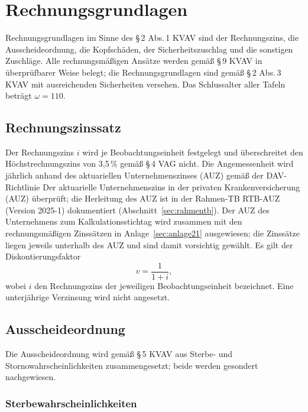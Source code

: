 \section{Rechnungsgrundlagen}\label{sec:rechnungsgrundlagen}

Rechnungsgrundlagen im Sinne des \S\,2 Abs.\,1 KVAV sind der
Rechnungszins, die Ausscheideordnung, die Kopfschäden, der
Sicherheitszuschlag und die sonstigen Zuschläge. Alle rechnungsmäßigen
Ansätze werden gemäß \S\,9 KVAV in überprüfbarer Weise belegt; die
Rechnungsgrundlagen sind gemäß \S\,2 Abs.\,3 KVAV mit ausreichenden
Sicherheiten versehen. Das Schlussalter aller Tafeln beträgt
$\omega = 110$.

\subsection{Rechnungszinssatz}\label{sec:zins}

Der Rechnungszins $i$ wird je Beobachtungseinheit festgelegt und
überschreitet den Höchstrechnungszins von 3{,}5\,\% gemäß \S\,4 VAG
nicht. Die Angemessenheit wird jährlich anhand des aktuariellen
Unternehmenszinses (AUZ) gemäß der DAV-Richtlinie
\glqq Der aktuarielle Unternehmenszins in der privaten
Krankenversicherung (AUZ)\grqq{} überprüft; die Herleitung des AUZ ist
in der Rahmen-TB \mbox{RTB-AUZ} (Version 2025-1) dokumentiert
(Abschnitt~\ref{sec:rahmentb}). Der AUZ des Unternehmens zum
Kalkulationsstichtag wird zusammen mit den rechnungsmäßigen Zinssätzen
in Anlage~\ref{sec:anlage21} ausgewiesen; die Zinssätze
liegen jeweils unterhalb des AUZ und sind damit vorsichtig gewählt. Es gilt der Diskontierungsfaktor
\begin{equation}
v = \frac{1}{1+i},
\label{eq:diskont}
\end{equation}
wobei $i$ den Rechnungszins der jeweiligen Beobachtungseinheit
bezeichnet. Eine unterjährige Verzinsung wird nicht angesetzt.

\subsection{Ausscheideordnung}\label{sec:ausscheideordnung}

Die Ausscheideordnung wird gemäß \S\,5 KVAV aus Sterbe- und
Stornowahrscheinlichkeiten zusammengesetzt; beide werden gesondert
nachgewiesen.

\subsubsection{Sterbewahrscheinlichkeiten}\label{sec:sterblichkeit}

